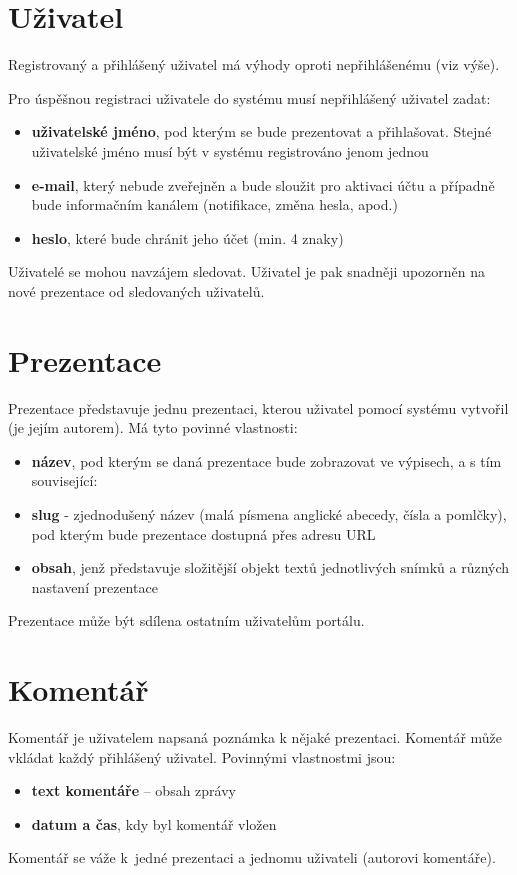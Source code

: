 \documentclass[11pt,twoside,a4paper]{book}
\begin{document}
\section{Uživatel}
Registrovaný a přihlášený uživatel má výhody oproti nepřihlášenému (viz výše).

Pro úspěšnou registraci uživatele do systému musí nepřihlášený uživatel zadat:

\begin{itemize}
	\item \textbf{uživatelské jméno}, pod kterým se bude prezentovat a přihlašovat. Stejné uživatelské jméno musí být v systému registrováno jenom jednou
	\item \textbf{e-mail}, který nebude zveřejněn a bude sloužit pro aktivaci účtu a případně bude informačním kanálem (notifikace, změna hesla, apod.)
	\item \textbf{heslo}, které bude chránit jeho účet (min. 4 znaky)
\end{itemize}
Uživatelé se mohou navzájem sledovat. Uživatel je pak snadněji upozorněn na nové prezentace od sledovaných uživatelů.

\section{Prezentace}
Prezentace představuje jednu prezentaci, kterou uživatel pomocí systému vytvořil (je jejím autorem). Má tyto povinné
vlastnosti:

\begin{itemize}
	\item \textbf{název}, pod kterým se daná prezentace bude zobrazovat ve výpisech, a s tím související:
	\item \textbf{slug} - zjednodušený název (malá písmena anglické abecedy, čísla a pomlčky), pod kterým bude prezentace dostupná přes adresu URL
	\item \textbf{obsah}, jenž představuje složitější objekt textů jednotlivých snímků a různých nastavení prezentace
\end{itemize}
Prezentace může být sdílena ostatním uživatelům portálu.

\section{Komentář}
Komentář je uživatelem napsaná poznámka k nějaké prezentaci. Komentář může vkládat každý přihlášený uživatel. Povinnými
vlastnostmi jsou:

\begin{itemize}
	\item \textbf{text komentáře} – obsah zprávy
	\item \textbf{datum a čas}, kdy byl komentář vložen
\end{itemize}
Komentář se váže k~jedné prezentaci a jednomu uživateli (autorovi komentáře).
\end{document}

